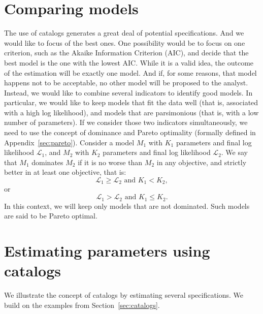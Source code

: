 \documentclass[12pt,a4paper]{article}
\renewcommand{\L}{\mathcal{L}}
\begin{document}
\section{Comparing models}

The use of catalogs generates a great deal of potential
specifications. And we would like to focus of the best ones. One
possibility would be to focus on one criterion, such as the Akaike
Information Criterion (AIC), and decide that the best model is the one
with the lowest AIC. While it is a valid idea, the outcome of the
estimation will be exactly one model. And if, for some reasons, that
model happens not to be acceptable, no other model will be proposed to
the analyst. Instead, we would like to combine several indicators to
identify good models. In particular, we would like to keep models that
fit the data well (that is, associated with a high log likelihood),
and models that are parsimonious (that is, with a low number of
parameters). If we consider those two indicators simultaneously, we need to use the
concept of dominance and Pareto optimality (formally defined in
Appendix~\ref{sec:pareto}). Consider a model $M_1$ with $K_1$ parameters and final log likelihood $\L_1$,  and $M_2$ with $K_2$ parameters and final log likelihood $\L_2$.
We say that $M_1$ dominates $M_2$ if it is no worse than $M_2$ in any objective, and strictly better in at least one objective, that is:
\[
\L_1 \geq \L_2 \text{ and } K_1 < K_2,
\]
or
\[
\L_1 > \L_2 \text{ and } K_1 \leq K_2.
\]
In this context, we will keep only models that are not dominated. Such
models are said to be Pareto optimal.


\section{Estimating parameters using catalogs}\label{sec:estimation}

We illustrate the concept of catalogs by estimating several
specifications. We build on the examples from
Section~\vref{sec:catalogs}.
\end{document}

